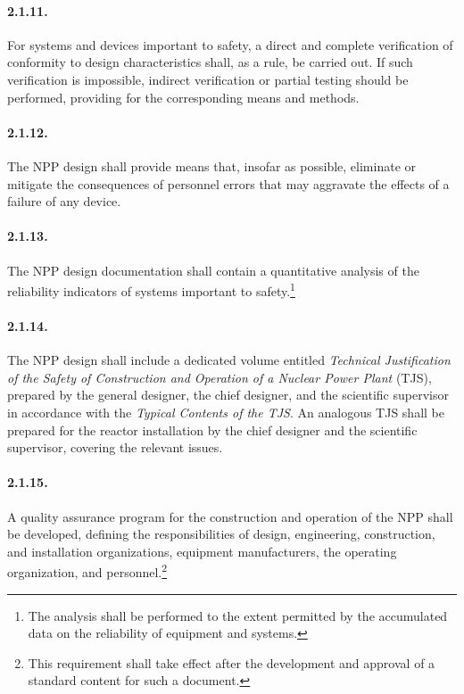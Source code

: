 \documentclass[openright]{bookest}
\begin{document}
\paragraph{2.1.11.}
For systems and devices important to safety, a direct and complete verification of conformity to design characteristics shall, as a rule, be carried out. If such verification is impossible, indirect verification or partial testing should be performed, providing for the corresponding means and methods.

\paragraph{2.1.12.}
The NPP design shall provide means that, insofar as possible, eliminate or mitigate the consequences of personnel errors that may aggravate the effects of a failure of any device.

\paragraph{2.1.13.}
The NPP design documentation shall contain a quantitative analysis of the reliability indicators of systems important to safety.\footnote{The analysis shall be performed to the extent permitted by the accumulated data on the reliability of equipment and systems.}

\paragraph{2.1.14.}
The NPP design shall include a dedicated volume entitled \textit{Technical Justification of the Safety of Construction and Operation of a Nuclear Power Plant} (TJS), prepared by the general designer, the chief designer, and the scientific supervisor in accordance with the \textit{Typical Contents of the TJS}.  
An analogous TJS shall be prepared for the reactor installation by the chief designer and the scientific supervisor, covering the relevant issues.

\paragraph{2.1.15.}
A quality assurance program for the construction and operation of the NPP shall be developed, defining the responsibilities of design, engineering, construction, and installation organizations, equipment manufacturers, the operating organization, and personnel.\footnote{This requirement shall take effect after the development and approval of a standard content for such a document.}
\end{document}
